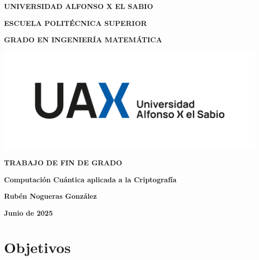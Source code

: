 \documentclass{article}
\begin{document}
    \begin{titlepage}
        \centering
        {\fontsize{18pt}{22pt}\selectfont \textbf{UNIVERSIDAD ALFONSO X EL SABIO}\par}
        \vspace{1cm}
        {\fontsize{16pt}{22pt}\selectfont \textbf{ESCUELA POLITÉCNICA SUPERIOR}\par}
        \vspace{1cm}
        {\fontsize{14pt}{22pt}\selectfont \textbf{GRADO EN INGENIERÍA MATEMÁTICA}\par}
        \vspace{2cm}
        {\includegraphics[width=1\textwidth]{img/portada.png}\par}
        \vspace{0.5cm}
        {\fontsize{20pt}{22pt}\selectfont \textbf{TRABAJO DE FIN DE GRADO}\par}
        \vspace{1cm}
        {\fontsize{14pt}{22pt}\selectfont \textbf{Computación Cuántica aplicada a la Criptografía}\par}
        \vfill
        {\fontsize{14pt}{22pt}\selectfont \textbf{Rubén Nogueras González}\par}
        \vspace{1cm}
        {\fontsize{14pt}{22pt}\selectfont \textbf{Junio de 2025}\par}
    \end{titlepage}
    
    \newpage
    \thispagestyle{empty}
    \mbox{}
    \newpage

    \tableofcontents

    \newpage
    \thispagestyle{empty}
    \mbox{}
    \newpage

    \listoffigures

    \newpage
    \thispagestyle{empty}
    \mbox{}
    \newpage

    \section{Objetivos}
\end{document}
